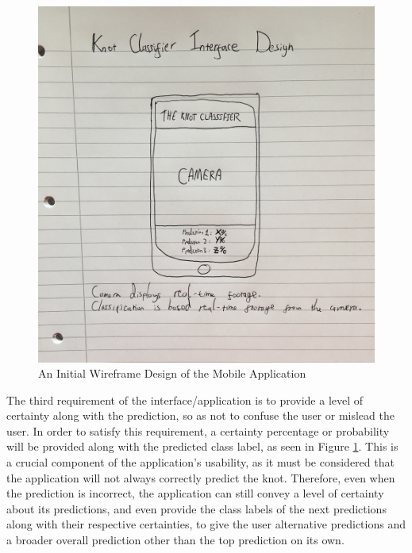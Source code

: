 \documentclass{l4proj}
\begin{document}
\begin{figure}
	\centering
	\includegraphics[scale=0.1]{AppDesign}
	\caption{An Initial Wireframe Design of the Mobile Application}
	\label{fig:AppDesign}
\end{figure}

The third requirement of the interface/application is to provide a level of certainty along with the prediction, so as not to confuse the user or mislead the user.
In order to satisfy this requirement, a certainty percentage or probability will be provided along with the predicted class label, as seen in Figure \ref{fig:AppDesign}.
This is a crucial component of the application's usability, as it must be considered that the application will not always correctly predict the knot.
Therefore, even when the prediction is incorrect, the application can still convey a level of certainty about its predictions, and even provide the class labels of the next predictions along with their respective certainties, to give the user alternative predictions and a broader overall prediction other than the top prediction on its own.   


\end{document}
